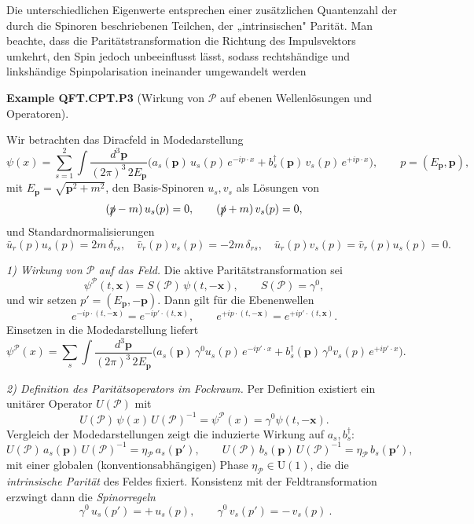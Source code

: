 \documentclass[10pt, letterpaper]{article}
\newcommand{\U}{\mathrm{U}}
\newcommand{\CustomHeading}[3]{%
  \par\medskip\noindent%
  \textbf{#1 #2} \textnormal{(#3)}.\enskip%
}
\newenvironment{EXA}[2]{\begin{unitbox}\CustomHeading{Example}{#1}{#2}}{\end{unitbox}}
\begin{document}
Die unterschiedlichen Eigenwerte entsprechen einer zusätzlichen Quantenzahl der durch die Spinoren beschriebenen Teilchen, der „intrinsischen" Parität. Man beachte, dass die Paritätstransformation die Richtung des Impulsvektors umkehrt, den Spin jedoch unbeeinflusst lässt, sodass rechtshändige und linkshändige Spinpolarisation ineinander umgewandelt werden

\begin{EXA}{QFT.CPT.P3}{Wirkung von $\mathcal P$ auf ebenen Wellenlösungen und Operatoren}
Wir betrachten das Diracfeld in Modedarstellung
\[
\psi(x)
=\sum_{s=1}^2\int\!\frac{d^3\mathbf p}{(2\pi)^3\,2E_{\mathbf p}}
\Big(
a_s(\mathbf p)\,u_s(p)\,e^{-ip\cdot x}
+
b_s^\dagger(\mathbf p)\,v_s(p)\,e^{+ip\cdot x}
\Big),
\qquad p=(E_{\mathbf p},\mathbf p),
\]
mit $E_{\mathbf p}=\sqrt{\mathbf p^2+m^2}$, den Basis-Spinoren $u_s,v_s$ als Lösungen von
\[
(\slashed p-m)\,u_s(p)=0,\qquad (\slashed p+m)\,v_s(p)=0,
\]
und Standardnormalisierungen
\[
\bar u_r(p)u_s(p)=2m\,\delta_{rs},\quad \bar v_r(p)v_s(p)=-2m\,\delta_{rs},\quad
\bar u_r(p)v_s(p)=\bar v_r(p)u_s(p)=0.
\]

\emph{1) Wirkung von $\mathcal P$ auf das Feld.}
Die aktive Paritätstransformation sei
\[
\psi^{\mathcal P}(t,\mathbf x)=S(\mathcal P)\,\psi(t,-\mathbf x),\qquad
S(\mathcal P)=\gamma^0,
\]
und wir setzen $p'=(E_{\mathbf p},-\mathbf p)$. Dann gilt für die Ebenenwellen
\[
e^{-ip\cdot (t,-\mathbf x)}=e^{-ip'\cdot (t,\mathbf x)},\qquad
e^{+ip\cdot (t,-\mathbf x)}=e^{+ip'\cdot (t,\mathbf x)}.
\]
Einsetzen in die Modedarstellung liefert
\[
\psi^{\mathcal P}(x)=
\sum_s\!\int\!\frac{d^3\mathbf p}{(2\pi)^3\,2E_{\mathbf p}}
\Big(
a_s(\mathbf p)\,\gamma^0 u_s(p)\,e^{-ip'\cdot x}
+
b_s^\dagger(\mathbf p)\,\gamma^0 v_s(p)\,e^{+ip'\cdot x}
\Big).
\]

\emph{2) Definition des Paritätsoperators im Fockraum.}
Per Definition existiert ein unitärer Operator $U(\mathcal P)$ mit
\[
U(\mathcal P)\,\psi(x)\,U(\mathcal P)^{-1}=\psi^{\mathcal P}(x)=\gamma^0\psi(t,-\mathbf x).
\]
Vergleich der Modedarstellungen zeigt die induzierte Wirkung auf $a_s,b_s^\dagger$:
\[
U(\mathcal P)\,a_s(\mathbf p)\,U(\mathcal P)^{-1}=\eta_{\mathcal P}\,a_s(\mathbf p'),\qquad
U(\mathcal P)\,b_s(\mathbf p)\,U(\mathcal P)^{-1}=\eta_{\mathcal P}\,b_s(\mathbf p'),
\]
mit einer globalen (konventionsabhängigen) Phase $\eta_{\mathcal P}\in \U(1)$, die die \emph{intrinsische Parität} des Feldes fixiert. Konsistenz mit der Feldtransformation erzwingt dann die \emph{Spinorregeln}
\[
\boxed{\ \gamma^0\,u_s(p')=+\,u_s(p),\qquad \gamma^0\,v_s(p')=-\,v_s(p)\ }.
\]


\end{EXA}
\end{document}
